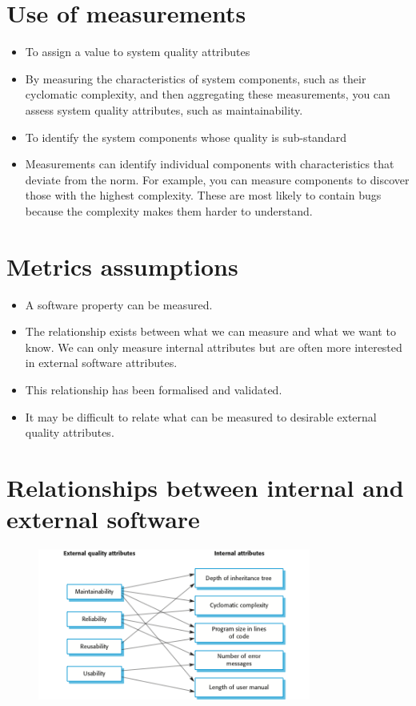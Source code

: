 \section {Use of measurements}
\begin{itemize}

\item To assign a value to system quality attributes

  \item By measuring the characteristics of system components, such as their cyclomatic complexity, and then aggregating these measurements, you can assess system quality attributes, such as maintainability.

\item To identify the system components whose quality is sub-standard

  \item Measurements can identify individual components with characteristics that deviate from the norm. For example, you can measure components to discover those with the highest complexity. These are most likely to contain bugs because the complexity makes them harder to understand.

\end{itemize}
\section {Metrics assumptions}
\begin{itemize}

\item A software property can be measured.

\item The relationship exists between what we can measure and what we want to know. We can only
measure internal attributes but are often more interested in external software attributes.

\item This relationship has been formalised and validated.

\item It may be difficult to relate what can be measured to desirable external quality attributes.
\end{itemize}
\newpage
\section {Relationships between internal and external software}
\begin{figure}[h!]
    \centering
    \includegraphics[width = 0.8\textwidth]{./figures/L7_7.png}
    \caption{}
    \label{fig:L7_7}
\end{figure}


